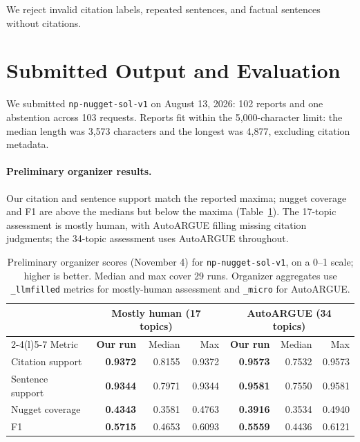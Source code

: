\documentclass[11pt,letterpaper]{article}
\begin{document}
We reject invalid citation labels, repeated sentences, and factual sentences without citations.

\FloatBarrier

\section{Submitted Output and Evaluation}
We submitted \texttt{np-nugget-sol-v1} on August 13, 2026: 102 reports and one abstention across 103 requests. Reports fit within the 5,000-character limit: the median length was 3,573 characters and the longest was 4,877, excluding citation metadata.

\paragraph{Preliminary organizer results.}
Our citation and sentence support match the reported maxima; nugget coverage and F1 are above the medians but below the maxima (Table~\ref{tab:organizer-results}). The 17-topic assessment is mostly human, with AutoARGUE filling missing citation judgments; the 34-topic assessment uses AutoARGUE throughout.

\begin{table}[!ht]
\centering\renewcommand{\arraystretch}{1.12}
\begin{tabular}{@{}lrrrrrr@{}}
\toprule
& \multicolumn{3}{c}{Mostly human (17 topics)} & \multicolumn{3}{c}{AutoARGUE (34 topics)}\\
\cmidrule(lr){2-4}\cmidrule(l){5-7}
Metric & \textbf{Our run} & Median & Max & \textbf{Our run} & Median & Max\\
\midrule
Citation support & \textbf{0.9372} & 0.8155 & 0.9372 & \textbf{0.9573} & 0.7532 & 0.9573\\
Sentence support & \textbf{0.9344} & 0.7971 & 0.9344 & \textbf{0.9581} & 0.7550 & 0.9581\\
Nugget coverage & \textbf{0.4343} & 0.3581 & 0.4763 & \textbf{0.3916} & 0.3534 & 0.4940\\
F1 & \textbf{0.5715} & 0.4653 & 0.6093 & \textbf{0.5559} & 0.4436 & 0.6121\\
\bottomrule
\end{tabular}
\caption{Preliminary organizer scores (November 4) for \texttt{np-nugget-sol-v1}, on a 0--1 scale; higher is better. Median and max cover 29 runs. Organizer aggregates use \texttt{\_llmfilled} metrics for mostly-human assessment and \texttt{\_micro} for AutoARGUE.}
\label{tab:organizer-results}
\end{table}
\end{document}
